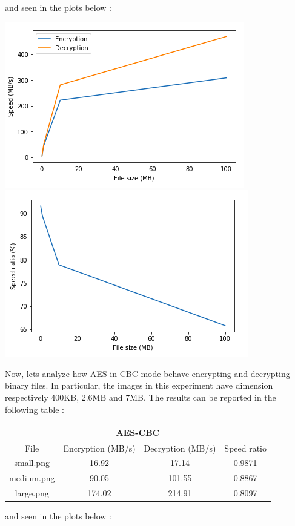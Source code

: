 \documentclass[11pt]{article}
\begin{document}
and seen in the plots below :
\begin{center}
\includegraphics[scale=0.40]{./aes_cbc_speed_comparison.png}
\includegraphics[scale=0.40]{./aes_cbc_speed_ratio.png}
\end{center}
Now, lets analyze how AES in CBC mode behave encrypting and decrypting binary files. In particular, the images in this experiment have dimension respectively 400KB, 2.6MB and 7MB. The results can be reported in the following table : 
\begin{center}
\begin{tabular}{| c | c | c | c |}
\hline
\multicolumn{4}{|c|}{AES-CBC} \\
\hline
File & Encryption (MB/s) & Decryption (MB/s) & Speed ratio\\
\hline
small.png & 16.92 & 17.14 & 0.9871 \\
\hline
medium.png & 90.05 & 101.55 & 0.8867 \\
\hline
large.png & 174.02 & 214.91  & 0.8097 \\
\hline
\end{tabular}
\end{center}
and seen in the plots below :
\end{document}
